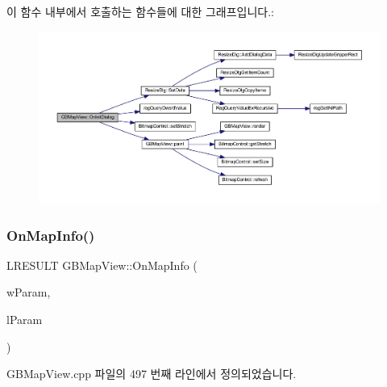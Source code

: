 이 함수 내부에서 호출하는 함수들에 대한 그래프입니다.\+:
\nopagebreak
\begin{figure}[H]
\begin{center}
\leavevmode
\includegraphics[width=350pt]{class_g_b_map_view_a3bcd4b5e76fbe0ae04809770fce64765_cgraph}
\end{center}
\end{figure}
\mbox{\label{class_g_b_map_view_afcc3ed555a52330d768b2cfb0f726dfc}} 
\subsubsection{\texorpdfstring{On\+Map\+Info()}{OnMapInfo()}}
{\footnotesize\ttfamily L\+R\+E\+S\+U\+LT G\+B\+Map\+View\+::\+On\+Map\+Info (\begin{DoxyParamCaption}\item[{W\+P\+A\+R\+AM}]{w\+Param,  }\item[{L\+P\+A\+R\+AM}]{l\+Param }\end{DoxyParamCaption})}



G\+B\+Map\+View.\+cpp 파일의 497 번째 라인에서 정의되었습니다.


